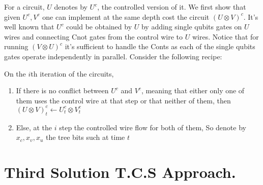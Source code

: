 \documentclass[manuscript,screen,review]{acmart}
\begin{document}
For a circuit, $U$ denotes by $U^{c}$, the controlled version of it. We first show that given $U^{c},V^{c}$ one can implement at the same depth cost the circuit $(U\otimes V)^{c}$. It's well known that $U^{c}$ could be obtained by $U$ by adding single qubits gates on $U$ wires and connecting Cnot gates from the control wire to $U$ wires. Notice that for running $(V\otimes U)^{c}$ it's sufficient to handle the Conts as each of the single qubits gates operate independently in parallel. Consider the following recipe: 

On the $i$th iteration of the circuits,
\begin{enumerate}  
  \item If there is no conflict between $U^{c}$ and $V^{c}$, meaning that either only one of them uses the control wire at that step or that neither of them, then $(U \otimes V)^{c}_{t} \leftarrow U^{c}_{t} \otimes V^{c}_{t}$
  \item Else, at the $i$ step the controlled wire flow for both of them, So denote by $ x_{c},x_{v},x_{u}$ the tree bits such at time $t$   

\end{enumerate}
  
 

\section{Third Solution T.C.S Approach.}  

\printbibliography
\end{document}
